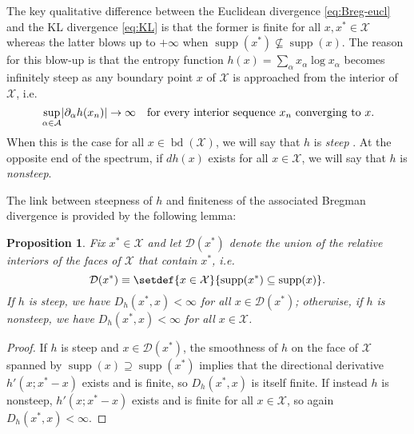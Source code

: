 \documentclass[reqno]{amsart}
\DeclarePairedDelimiter{\abs}{\lvert}{\rvert}
\theoremstyle{plain}
\newtheorem{proposition}[theorem]{Proposition}
\theoremstyle{definition}
\theoremstyle{remark}
\numberwithin{equation}{section}
\numberwithin{theorem}{section}
\begin{document}
The key qualitative difference between the Euclidean divergence \eqref{eq:Breg-eucl} and the \ac{KL} divergence \eqref{eq:KL} is that the former is finite for all ${x},{x^{\ast}}\in{\mathcal{X}}$ whereas the latter blows up to $+\infty$ when $\operatorname{supp}({x^{\ast}}) \nsubseteq \operatorname{supp}({x})$.
The reason for this blow-up is that the entropy function $h(x) = \sum_{\alpha} x_{\alpha} \log x_{\alpha}$ becomes infinitely steep as any boundary point ${x}$ of ${\mathcal{X}}$ is approached from the interior of ${\mathcal{X}}$, i.e.
\begin{equation}
\label{eq:steep}
{\textstyle}
\sup_{\alpha\in{\mathcal{A}}} \abs{{\partial}_{\alpha} h({x}_{n})}
	\to \infty
	\quad
	\text{for every interior sequence ${x}_{n}$ converging to ${x}$.}
\end{equation}
When this is the case for all ${x}\in\operatorname{bd}({\mathcal{X}})$, we will say that $h$ is \emph{steep} \citep{HS02,ABB04,CGM15}.
At the opposite end of the spectrum, if $dh(x)$ exists for all $x\in{\mathcal{X}}$, we will say that $h$ is \emph{nonsteep}.

The link between steepness of $h$ and finiteness of the associated Bregman divergence is provided by the following lemma:

\begin{proposition}
\label{prop:Bregman}
Fix ${x^{\ast}}\in{\mathcal{X}}$ and let ${\mathcal{D}}({x^{\ast}})$ denote the union of the relative interiors of the faces of ${\mathcal{X}}$ that contain ${x^{\ast}}$, i.e.
\begin{equation}
\label{eq:domain}
{\mathcal{D}}({x^{\ast}})
	\equiv \setdef{{x}\in{\mathcal{X}}}{\operatorname{supp}({x^{\ast}}) \subseteq \operatorname{supp}({x})}.
\end{equation}
If $h$ is steep, we have ${D_{h}}({x^{\ast}},{x})<\infty$ for all $x\in{\mathcal{D}}({x^{\ast}})$;
otherwise, if $h$ is nonsteep, we have ${D_{h}}({x^{\ast}},{x}) < \infty$ for all $x\in{\mathcal{X}}$.
\end{proposition}

\begin{proof}
If $h$ is steep and ${x} \in {\mathcal{D}}({x^{\ast}})$, the smoothness of $h$ on the face of ${\mathcal{X}}$ spanned by $\operatorname{supp}(x)\supseteq\operatorname{supp}({x^{\ast}})$ implies that the directional derivative $h'({x};{x^{\ast}}-{x})$ exists and is finite, so ${D_{h}}({x^{\ast}},{x})$ is itself finite.
If instead $h$ is nonsteep, $h'({x};{x^{\ast}}-{x})$ exists and is finite for all ${x}\in{\mathcal{X}}$, so again ${D_{h}}({x^{\ast}},{x}) < \infty$.
\end{proof}
\end{document}
